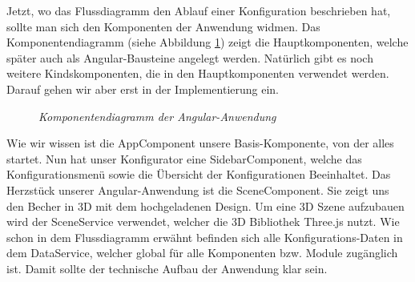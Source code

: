  Jetzt, wo das Flussdiagramm den Ablauf einer Konfiguration beschrieben hat, sollte man sich den Komponenten der Anwendung widmen. Das Komponentendiagramm (siehe Abbildung \ref{fig:ngKomponent}) zeigt die Hauptkomponenten, welche später auch als Angular-Bausteine angelegt werden. Natürlich gibt es noch weitere Kindskomponenten, die in den Hauptkomponenten verwendet werden. Darauf gehen wir aber erst in der Implementierung ein.
\begin{figure}[h]
	\centering
	{}
	\caption[Komponentendiagramm]{\textit{Komponentendiagramm der Angular-Anwendung}}
	\label{fig:ngKomponent}
\end{figure} 
Wie wir wissen ist die AppComponent unsere Basis-Komponente, von der alles startet. Nun hat unser Konfigurator eine SidebarComponent, welche das Konfigurationsmenü sowie die Übersicht der Konfigurationen Beeinhaltet. Das Herzstück unserer Angular-Anwendung ist die SceneComponent. Sie zeigt uns den Becher in 3D mit dem hochgeladenen Design. Um eine 3D Szene aufzubauen wird der SceneService verwendet, welcher die 3D Bibliothek Three.js nutzt. Wie schon in dem Flussdiagramm erwähnt befinden sich alle Konfigurations-Daten in dem DataService, welcher global für alle Komponenten bzw. Module zugänglich ist. Damit sollte der technische Aufbau der Anwendung klar sein.
